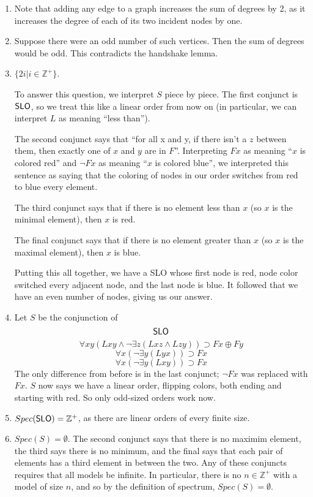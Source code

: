 \begin{mdframed}[linewidth=1]
\begin{enumerate}
    \item Note that adding any edge to a graph increases the sum of degrees by 2, as it increases the degree of each of its two incident nodes by one. 

    \item Suppose there were an odd number of such vertices. Then the sum of degrees would be odd. This contradicts the handshake lemma.

    
    \item $\{2i | i \in \mathbb{Z}^+\}$. 

   To answer this question, we interpret $S$ piece by piece. The first conjunct is $\mbox{$\mathsf{SLO}$}$, so we treat this like a linear order from now on (in particular, we can interpret $L$ as meaning ``less than''). 

   The second conjunct says that ``for all x and y, if there isn't a $z$ between them, then exactly one of $x$ and $y$ are in $F$''. Interpreting $Fx$ as meaning ``$x$ is colored red'' and $\lnot Fx$ as meaning ``$x$ is colored blue'', we interpreted this sentence as saying that the coloring of nodes in our order switches from red to blue every element. 

   The third conjunct says that if there is no element less than $x$ (so $x$ is the minimal element), then $x$ is red.

   The final conjunct says that if there is no element greater than $x$ (so $x$ is the maximal element), then $x$ is blue. 

   Putting this all together, we have a SLO whose first node is red, node color switched every adjacent node, and the last node is blue. It followed that we have an even number of nodes, giving us our answer.  

    \item Let $S$ be the conjunction of 
    \[
       \mbox{$\mathsf{SLO}$}
   \]
   \[
       \forall xy(Lxy \land \lnot \exists z(Lxz \land Lzy)) \supset Fx \oplus Fy
   \]
   \[
       \forall x(\lnot \exists y(Lyx))\supset Fx
   \]
   \[
       \forall x(\lnot \exists y(Lxy))\supset Fx
   \]
   The only difference from before is in the last conjunct; $\lnot Fx$ was replaced with $Fx$. $S$ now says we have a linear order, flipping colors, both ending and starting with red. So only odd-sized orders work now.

    \item $Spec(\mbox{$\mathsf{SLO}$}) = \mathbb{Z}^+$, as there are linear orders of every finite size. 

    \item $Spec(S) = \emptyset$. The second conjunct says that there is no maximim element, the third says there is no minimum, and the final says that each pair of elements has a third element in between the two. Any of these conjuncts requires that all models be infinite. In particular, there is no $n \in \mathbb{Z}^+$ with a model of size $n$, and so by the definition of spectrum, $Spec(S) = \emptyset$. 


\end{enumerate}
\end{mdframed}

